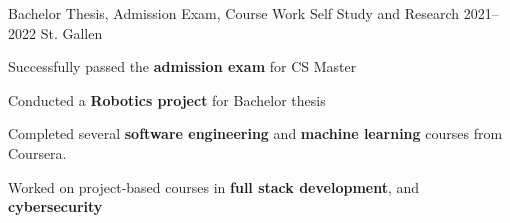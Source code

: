 \begin{cventries}
	\cventry
	{Bachelor Thesis, Admission Exam, Course Work} %
	{Self Study and Research} %
	{2021--2022} %
	{St. Gallen} %
	{
		\begin{cvitems} %
			\item {Successfully passed the \textbf{admission exam} for CS Master}
			\item {Conducted a \textbf{Robotics project} for Bachelor thesis}
			\item {Completed several \textbf{software engineering} and \textbf{machine learning} courses from Coursera}.
			\item {Worked on project-based courses in \textbf{full stack development}, and \textbf{cybersecurity}}
		\end{cvitems}
	}
	{}


\end{cventries}
